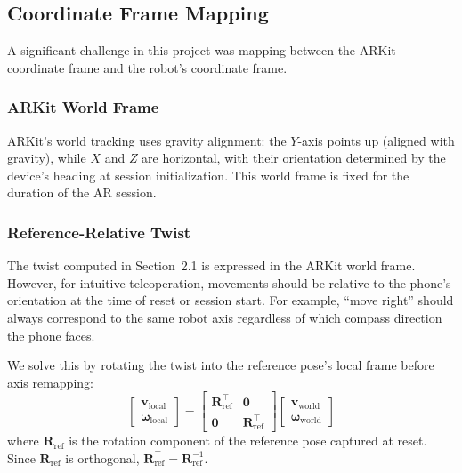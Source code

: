 \subsection{Coordinate Frame Mapping}
\label{sec:frame_mapping}

A significant challenge in this project was mapping between the ARKit coordinate frame and the robot's coordinate frame.

\subsubsection{ARKit World Frame}

ARKit's world tracking uses gravity alignment: the $Y$-axis points up (aligned with gravity), while $X$ and $Z$ are horizontal, with their orientation determined by the device's heading at session initialization. This world frame is fixed for the duration of the AR session.

\subsubsection{Reference-Relative Twist}

The twist computed in Section~2.1 is expressed in the ARKit world frame. However, for intuitive teleoperation, movements should be relative to the phone's orientation at the time of reset or session start. For example, ``move right'' should always correspond to the same robot axis regardless of which compass direction the phone faces.

We solve this by rotating the twist into the reference pose's local frame before axis remapping:
\begin{equation}
    \begin{bmatrix} \mathbf{v}_\text{local} \\ \boldsymbol{\omega}_\text{local} \end{bmatrix}
    = \begin{bmatrix} \mathbf{R}_\text{ref}^\top & \mathbf{0} \\ \mathbf{0} & \mathbf{R}_\text{ref}^\top \end{bmatrix}
    \begin{bmatrix} \mathbf{v}_\text{world} \\ \boldsymbol{\omega}_\text{world} \end{bmatrix}
    \label{eq:twist_rotation}
\end{equation}
where $\mathbf{R}_\text{ref}$ is the rotation component of the reference pose captured at reset. Since $\mathbf{R}_\text{ref}$ is orthogonal, $\mathbf{R}_\text{ref}^\top = \mathbf{R}_\text{ref}^{-1}$.

